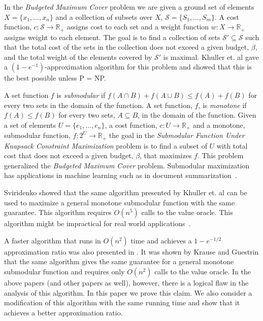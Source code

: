 In the \emph{Budgeted Maximum Cover} problem we are given a ground set of elements
$X = \{x_1, \dots, x_n\}$ and a collection of subsets over $X$,
$\mathcal{S} = \{S_1, \dots, S_m\}$.
A cost function, $c:\mathcal{S} \to \mathbb{R}_+$ assigns cost to each set
and a weight function $w:X \to \mathbb{R}_+$ assigns weight to each element.
The goal is to find a collection of sets $\mathcal{S'} \subseteq \mathcal{S}$ 
such that the total cost of the sets in the collection does not exceed a given budget, 
$\beta$, and the
total weight of the elements covered by $\mathcal{S'}$ is maximal.
Khuller et. al \cite{khuller1999budgeted}
gave a $(1-e^{-1})$-approximation algorithm for this problem and showed that this
is the best possible unless P = NP.

A set function $f$ is \emph{submodular} if $f(A \cap B) + f(A \cup B) \leq f(A) + f(B)$
for every two sets in the domain of the function. A set function, $f$, 
is \emph{monotone} if
$f(A) \leq f(B)$ for every two sets, $A \subseteq B$, in the domain of the function.
Given a set of elements $U = \{e_1, \dots, e_n\}$, a cost function,
$c:U \to \mathbb{R}_+$ and a monotone, submodular function, $f:2^U \to \mathbb{R}_+$
the goal in the 
\emph{Submodular Function Under Knapsack Constraint Maximization} 
problem is to find a subset of $U$ with total cost that does not exceed
a given budget, $\beta$, that maximizes $f$.
This problem generalized the \emph{Budgeted Maximum Cover} problem.
Submodular maximization has applications in machine learning such as in document summarization~\cite{lin2010multi}.

Sviridenko \cite{sviridenko2004note} showed that the same algorithm presented by
Khuller et. al can be used to maximize a general monotone submodular function
with the same guarantee.
This algorithm requires $O(n^5)$ calls to the value oracle.
This algorithm might be impractical for real world applications~\cite{lin2010multi}.

A faster algorithm that runs in $O(n^2)$ time and achieves a $1 - e^{-1/2}$ approximation ratio
was also presented in \cite{khuller1999budgeted}.
It was shown by Krause and Guestrin \cite{krause2005note} that the same algorithm
gives the same guarantee for a general monotone submodular function and requires only
$O(n^2)$ calls to the value oracle.
In the above papers (and other papers as well), however,
there is a logical flaw in the analysis of this algorithm.
In this paper we prove this claim.
We also consider a modification of this algorithm with the same running time and show that it
achieves a better approximation ratio.

